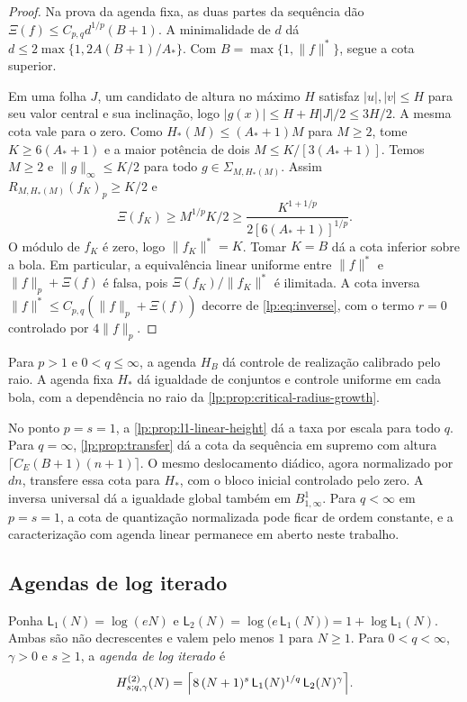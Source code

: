 \documentclass[12pt,a4paper]{article}
\begin{document}
\begin{proof}
Na prova da agenda fixa, as duas partes da sequência dão $\Xi(f)\le C_{p,q}d^{1/p}(B+1)$. A minimalidade de $d$ dá $d\le2\max\{1,2A(B+1)/A_*\}$. Com $B=\max\{1,\|f\|^*\}$, segue a cota superior.

Em uma folha $J$, um candidato de altura no máximo $H$ satisfaz $|u|,|v|\le H$ para seu valor central e sua inclinação, logo $|g(x)|\le H+H|J|/2\le3H/2$. A mesma cota vale para o zero. Como $H_*(M)\le(A_*+1)M$ para $M\ge2$, tome $K\ge6(A_*+1)$ e a maior potência de dois $M\le K/[3(A_*+1)]$. Temos $M\ge2$ e $\|g\|_\infty\le K/2$ para todo $g\in\Sigma_{M,H_*(M)}$. Assim $R_{M,H_*(M)}(f_K)_p\ge K/2$ e
\[
 \Xi(f_K)\ge M^{1/p}K/2\ge \frac{K^{1+1/p}}{2[6(A_*+1)]^{1/p}}.
\]
O módulo de $f_K$ é zero, logo $\|f_K\|^*=K$. Tomar $K=B$ dá a cota inferior sobre a bola. Em particular, a equivalência linear uniforme entre $\|f\|^*$ e $\|f\|_p+\Xi(f)$ é falsa, pois $\Xi(f_K)/\|f_K\|^*$ é ilimitada. A cota inversa $\|f\|^*\le C_{p,q}(\|f\|_p+\Xi(f))$ decorre de \eqref{lp:eq:inverse}, com o termo $r=0$ controlado por $4\|f\|_p$.
\end{proof}

\begin{observacao}
\label{lp:obs:critical-scope}
Para $p>1$ e $0<q\le\infty$, a agenda $H_B$ dá controle de realização calibrado pelo raio. A agenda fixa $H_*$ dá igualdade de conjuntos e controle uniforme em cada bola, com a dependência no raio da \cref{lp:prop:critical-radius-growth}.

No ponto $p=s=1$, a \cref{lp:prop:l1-linear-height} dá a taxa por escala para todo $q$. Para $q=\infty$, \cref{lp:prop:transfer} dá a cota da sequência em supremo com altura $\lceil C_E(B+1)(n+1)\rceil$. O mesmo deslocamento diádico, agora normalizado por $dn$, transfere essa cota para $H_*$, com o bloco inicial controlado pelo zero. A inversa universal dá a igualdade global também em $B^1_{1,\infty}$. Para $q<\infty$ em $p=s=1$, a cota de quantização normalizada pode ficar de ordem constante, e a caracterização com agenda linear permanece em aberto neste trabalho.
\end{observacao}

\subsection{Agendas de log iterado}
\label{lp:sec:loglog}

Ponha $\mathsf L_1(N)=\log(eN)$ e $\mathsf L_2(N)=\log\bigl(e\,\mathsf L_1(N)\bigr)=1+\log\mathsf L_1(N)$. Ambas são não decrescentes e valem pelo menos $1$ para $N\ge1$. Para $0<q<\infty$, $\gamma>0$ e $s\ge1$, a \emph{agenda de log iterado} é
\begin{equation}
 H^{(2)}_{s;q,\gamma}(N)=\Bigl\lceil8\,(N+1)^{s}\,\mathsf L_1(N)^{1/q}\,\mathsf L_2(N)^{\gamma}\Bigr\rceil .
 \label{lp:eq:loglog}
\end{equation}
\end{document}
